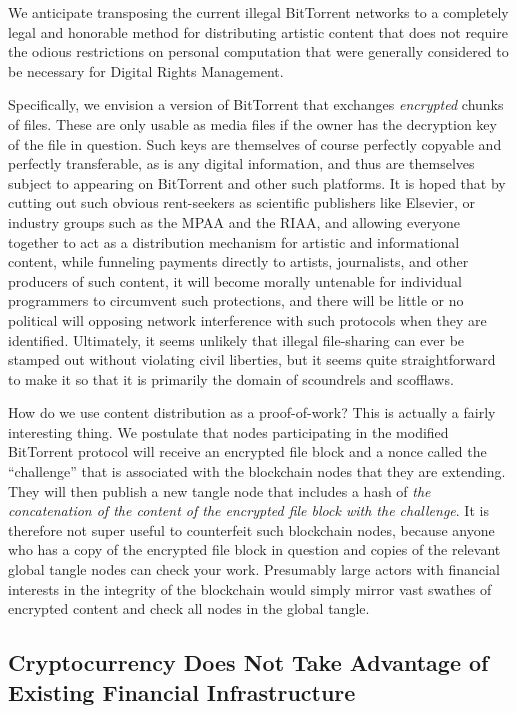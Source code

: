 \documentclass{article}
\begin{document}
We anticipate transposing the current illegal BitTorrent networks to a
completely legal and honorable method for distributing artistic
content that does not require the odious restrictions on personal
computation that were generally considered to be necessary for Digital
Rights Management.

Specifically, we envision a version of BitTorrent that exchanges {\em
  encrypted} chunks of files. These are only usable as media files if
the owner has the decryption key of the file in question. Such keys
are themselves of course perfectly copyable and perfectly
transferable, as is any digital information, and thus are themselves
subject to appearing on BitTorrent and other such platforms. It is
hoped that by cutting out such obvious rent-seekers as scientific
publishers like Elsevier, or industry groups such as the MPAA and the
RIAA, and allowing everyone together to act as a distribution
mechanism for artistic and informational content, while funneling
payments directly to artists, journalists, and other producers of such
content, it will become morally untenable for individual programmers
to circumvent such protections, and there will be little or no
political will opposing network interference with such protocols when
they are identified. Ultimately, it seems unlikely that illegal
file-sharing can ever be stamped out without violating civil
liberties, but it seems quite straightforward to make it so that it is
primarily the domain of scoundrels and scofflaws.

How do we use content distribution as a proof-of-work? This is
actually a fairly interesting thing. We postulate that nodes
participating in the modified BitTorrent protocol will receive an
encrypted file block and a nonce called the ``challenge'' that is
associated with the blockchain nodes that they are extending. They
will then publish a new tangle node that includes a hash of {\em the
  concatenation of the content of the encrypted file block with the
  challenge}. It is therefore not super useful to counterfeit such
blockchain nodes, because anyone who has a copy of the encrypted file
block in question and copies of the relevant global tangle nodes can
check your work. Presumably large actors with financial interests in
the integrity of the blockchain would simply mirror vast swathes of
encrypted content and check all nodes in the global tangle.


\subsection{Cryptocurrency Does Not Take Advantage of Existing Financial Infrastructure}
\end{document}
